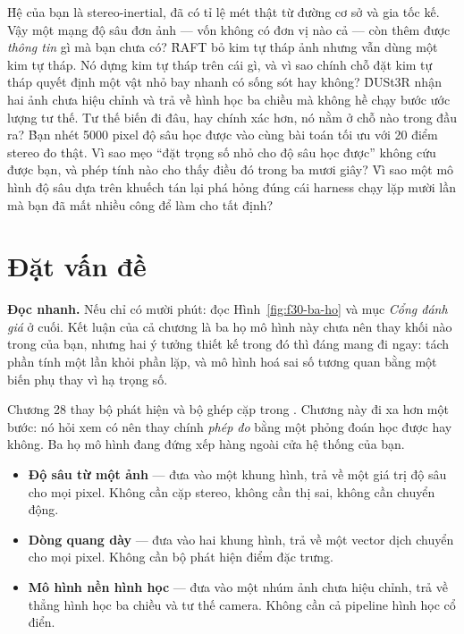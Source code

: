 \documentclass[../../deep_learning.tex]{subfiles}
\begin{document}
\begin{khoigoi}
\h{Hệ của bạn là stereo-inertial, đã có tỉ lệ mét thật từ đường cơ sở và gia tốc kế. Vậy một mạng độ sâu đơn ảnh --- vốn không có đơn vị nào cả --- còn thêm được \emph{thông tin} gì mà bạn chưa có?}
\h{RAFT bỏ kim tự tháp ảnh nhưng vẫn dùng một kim tự tháp. Nó dựng kim tự tháp trên cái gì, và vì sao chính chỗ đặt kim tự tháp quyết định một vật nhỏ bay nhanh có sống sót hay không?}
\h{DUSt3R nhận hai ảnh chưa hiệu chỉnh và trả về hình học ba chiều mà không hề chạy bước ước lượng tư thế. Tư thế biến đi đâu, hay chính xác hơn, nó nằm ở chỗ nào trong đầu ra?}
\h{Bạn nhét 5000 pixel độ sâu học được vào cùng bài toán tối ưu với 20 điểm stereo đo thật. Vì sao mẹo ``đặt trọng số nhỏ cho độ sâu học được'' không cứu được bạn, và phép tính nào cho thấy điều đó trong ba mươi giây?}
\h{Vì sao một mô hình độ sâu dựa trên khuếch tán lại phá hỏng đúng cái harness chạy lặp mười lần mà bạn đã mất nhiều công để làm cho tất định?}
\end{khoigoi}

\section{Đặt vấn đề}
\textbf{Đọc nhanh.} Nếu chỉ có mười phút: đọc Hình~\ref{fig:f30-ba-ho} và mục \emph{Cổng đánh giá} ở cuối. Kết luận của cả chương là ba họ mô hình này chưa nên thay khối nào trong  của bạn, nhưng hai ý tưởng thiết kế trong đó thì đáng mang đi ngay: tách phần tính một lần khỏi phần lặp, và mô hình hoá sai số tương quan bằng một biến phụ thay vì hạ trọng số.

Chương 28 thay bộ phát hiện và bộ ghép cặp trong . Chương này đi xa hơn một bước: nó hỏi xem có nên thay chính \emph{phép đo} bằng một phỏng đoán học được hay không. Ba họ mô hình đang đứng xếp hàng ngoài cửa hệ thống của bạn.

\begin{itemize}
\item \textbf{Độ sâu từ một ảnh} --- đưa vào một khung hình, trả về một giá trị độ sâu cho mọi pixel. Không cần cặp stereo, không cần thị sai, không cần chuyển động.
\item \textbf{Dòng quang dày} --- đưa vào hai khung hình, trả về một vector dịch chuyển cho mọi pixel. Không cần bộ phát hiện điểm đặc trưng.
\item \textbf{Mô hình nền hình học} --- đưa vào một nhúm ảnh chưa hiệu chỉnh, trả về thẳng hình học ba chiều và tư thế camera. Không cần cả pipeline hình học cổ điển.
\end{itemize}
\end{document}

